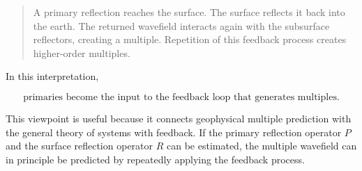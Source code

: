 \documentclass[11pt]{article}
\begin{document}
\begin{quote}
A primary reflection reaches the surface. The surface reflects it back into the
earth. The returned wavefield interacts again with the subsurface reflectors,
creating a multiple. Repetition of this feedback process creates higher-order
multiples.
\end{quote}

In this interpretation,

\begin{equation}
\boxed{
\text{primaries become the input to the feedback loop that generates multiples.}
}
\end{equation}

This viewpoint is useful because it connects geophysical multiple prediction
with the general theory of systems with feedback. If the primary reflection
operator $P$ and the surface reflection operator $R$ can be estimated, the
multiple wavefield can in principle be predicted by repeatedly applying the
feedback process.
\end{document}
